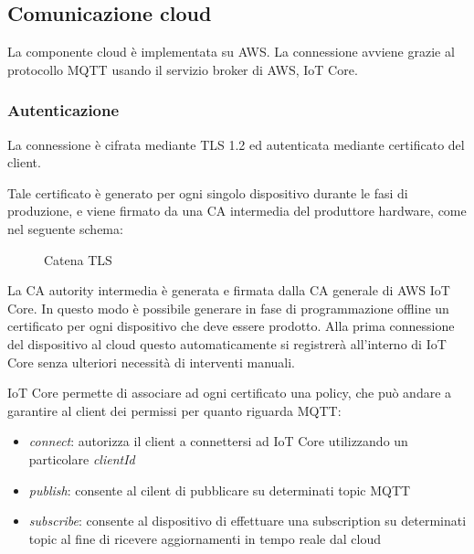 \documentclass[12pt,a4paper,twoside,titlepage]{book}
\begin{document}
\subsection{Comunicazione cloud}

La componente cloud è implementata su AWS. La connessione avviene grazie al protocollo
MQTT usando il servizio broker di AWS, IoT Core.

\subsubsection{Autenticazione}
La connessione è cifrata mediante TLS 1.2 ed autenticata mediante certificato del client.

Tale certificato è generato per ogni singolo dispositivo durante le fasi di produzione,
e viene firmato da una CA intermedia del produttore hardware, come nel seguente schema:

\begin{figure}[ht]
    \centering
    \caption{Catena TLS}
    \label{fig:tls-chain}
\end{figure}

La CA autority intermedia è generata e firmata dalla CA generale di AWS IoT Core. In questo
modo è possibile generare in fase di programmazione offline un certificato per ogni
dispositivo che deve essere prodotto. Alla prima connessione del dispositivo al cloud questo
automaticamente si registrerà all'interno di IoT Core senza ulteriori necessità di interventi manuali.

IoT Core permette di associare ad ogni certificato una policy, che può andare a garantire al
client dei permissi per quanto riguarda MQTT:
\begin{itemize}
    \item \textit{connect}: autorizza il client a connettersi ad IoT Core utilizzando un particolare
        \textit{clientId}
    \item \textit{publish}: consente al cilent di pubblicare su determinati topic MQTT
    \item \textit{subscribe}: consente al dispositivo di effettuare una subscription su determinati topic
        al fine di ricevere aggiornamenti in tempo reale dal cloud
\end{itemize}
\end{document}
